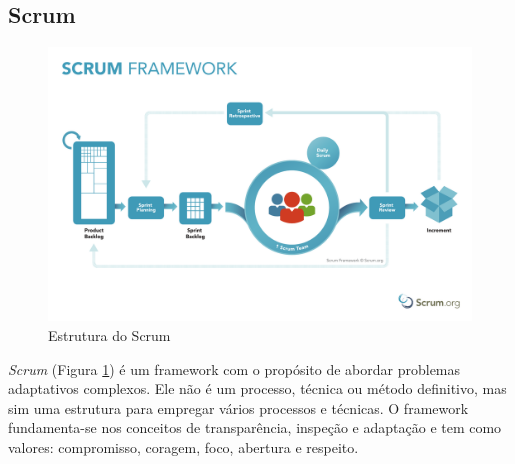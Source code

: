 \subsection{Scrum}
\begin{figure}[h]
    \centering
    \includegraphics[width=\textwidth]{pfc/figuras/scrum.pdf}
    \caption{Estrutura do Scrum}
    \label{fig:scrum}
\end{figure}

\textit{Scrum} (Figura \ref{fig:scrum})  é um framework com o propósito de abordar problemas adaptativos complexos. Ele não é um processo, técnica ou método definitivo, mas sim uma estrutura para empregar vários processos e técnicas. O framework fundamenta-se nos conceitos de transparência, inspeção e adaptação e tem como valores: compromisso, coragem, foco, abertura e respeito.

